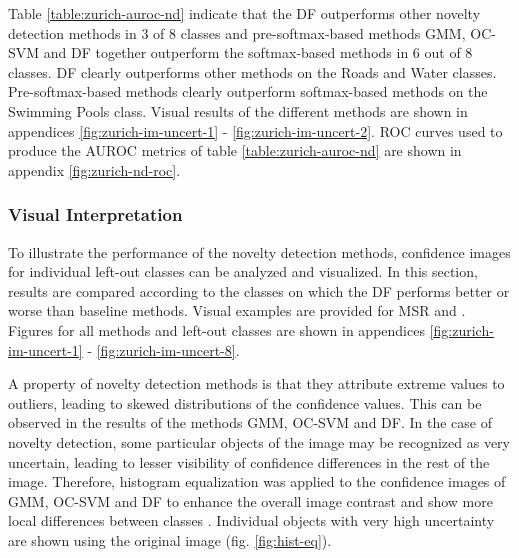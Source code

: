 \documentclass[10pt]{article}
\begin{document}
Table \ref{table:zurich-auroc-nd} indicate that the \gls{DF} outperforms other novelty detection methods in 3 of 8 classes and pre-softmax-based methods \gls{GMM}, \gls{OC-SVM} and \gls{DF} together outperform the softmax-based methods in 6 out of 8 classes. \gls{DF} clearly outperforms other methods on the Roads and Water classes. Pre-softmax-based methods clearly outperform softmax-based methods on the Swimming Pools class. Visual results of the different methods are shown in appendices \ref{fig:zurich-im-uncert-1} - \ref{fig:zurich-im-uncert-2}. \gls{ROC} curves used to produce the \gls{AUROC} metrics of table \ref{table:zurich-auroc-nd} are shown in appendix \ref{fig:zurich-nd-roc}.

\subsubsection{Visual Interpretation}

To illustrate the performance of the novelty detection methods, confidence images for individual left-out classes can be analyzed and visualized. In this section, results are compared according to the classes on which the \acrlong{DF} performs better or worse than baseline methods. Visual examples are provided for MSR and . Figures for all methods and left-out classes are shown in appendices \ref{fig:zurich-im-uncert-1} - \ref{fig:zurich-im-uncert-8}.

A property of novelty detection methods is that they attribute extreme values to outliers, leading to skewed distributions of the confidence values. This can be observed in the results of the methods \gls{GMM}, \gls{OC-SVM} and \gls{DF}. In the case of novelty detection, some particular objects of the image may be recognized as very uncertain, leading to lesser visibility of confidence differences in the rest of the image. Therefore, histogram equalization was applied to the confidence images of \gls{GMM}, \gls{OC-SVM} and \gls{DF} to enhance the overall image contrast and show more local differences between classes \cite{Gonzlez2012DigitalIP}. Individual objects with very high uncertainty are shown using the original image (fig.  \ref{fig:hist-eq}).
\end{document}
